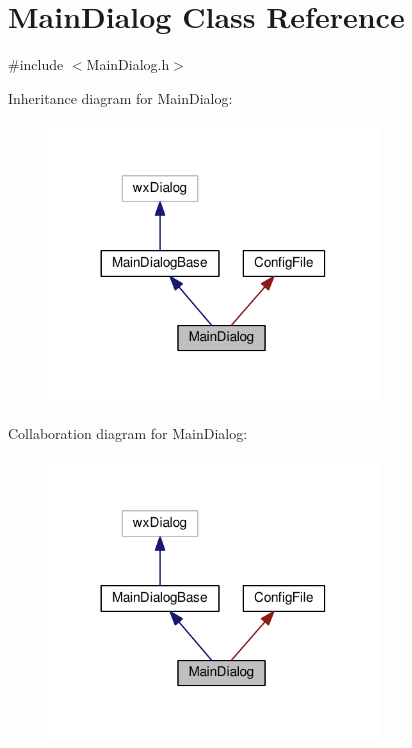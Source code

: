 \hypertarget{classMainDialog}{}\section{Main\+Dialog Class Reference}
\label{classMainDialog}


{\ttfamily \#include $<$Main\+Dialog.\+h$>$}



Inheritance diagram for Main\+Dialog\+:
\nopagebreak
\begin{figure}[H]
\begin{center}
\leavevmode
\includegraphics[width=248pt]{classMainDialog__inherit__graph}
\end{center}
\end{figure}


Collaboration diagram for Main\+Dialog\+:
\nopagebreak
\begin{figure}[H]
\begin{center}
\leavevmode
\includegraphics[width=248pt]{classMainDialog__coll__graph}
\end{center}
\end{figure}
